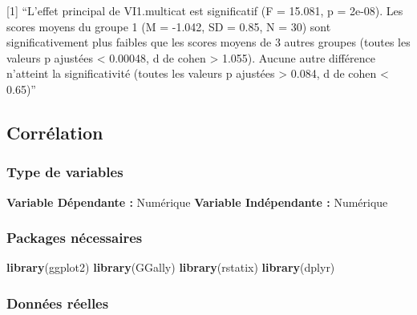 \documentclass[
]{book}
\newenvironment{Shaded}{\begin{snugshade}}{\end{snugshade}}
\newcommand{\KeywordTok}[1]{\textcolor[rgb]{0.13,0.29,0.53}{\textbf{#1}}}
\newcommand{\NormalTok}[1]{#1}
\begin{document}
{[}1{]} ``L'effet principal de VI1.multicat est significatif (F = 15.081, p = 2e-08). Les scores moyens du groupe 1 (M = -1.042, SD = 0.85, N = 30) sont significativement plus faibles que les scores moyens de 3 autres groupes (toutes les valeurs p ajustées \textless{} 0.00048, d de cohen \textgreater{} 1.055). Aucune autre différence n'atteint la significativité (toutes les valeurs p ajustées \textgreater{} 0.084, d de cohen \textless{} 0.65)''

\hypertarget{corruxe9lation}{%
\subsection{Corrélation}\label{corruxe9lation}}

\hypertarget{type-de-variables-2}{%
\subsubsection{Type de variables}\label{type-de-variables-2}}

\textbf{Variable Dépendante :} Numérique
\textbf{Variable Indépendante :} Numérique

\hypertarget{packages-nuxe9cessaires-2}{%
\subsubsection{Packages nécessaires}\label{packages-nuxe9cessaires-2}}

\begin{Shaded}
\begin{Highlighting}[]
\KeywordTok{library}\NormalTok{(ggplot2)}
\KeywordTok{library}\NormalTok{(GGally)}
\KeywordTok{library}\NormalTok{(rstatix)}
\KeywordTok{library}\NormalTok{(dplyr)}
\end{Highlighting}
\end{Shaded}

\hypertarget{donnuxe9es-ruxe9elles-2}{%
\subsubsection{Données réelles}\label{donnuxe9es-ruxe9elles-2}}
\end{document}
